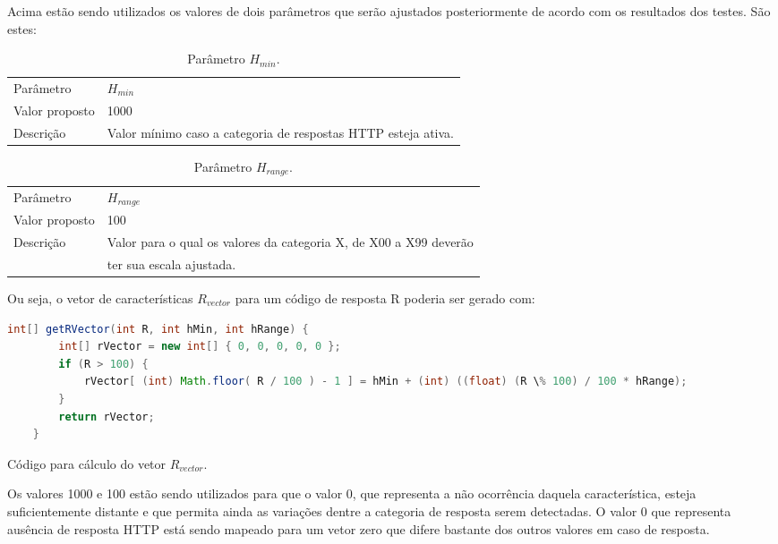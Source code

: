 Acima estão sendo utilizados os valores de dois parâmetros que serão ajustados
posteriormente de acordo com os resultados dos testes. São estes:

\begin{table}[H]
\caption{Parâmetro $H_{min}$.}
\vspace{0.25cm}
\begin{tabular}{ll}
Parâmetro      & $H_{min}$ \\
Valor proposto & 1000 \\
Descrição      & Valor mínimo caso a categoria de respostas HTTP esteja ativa.
\end{tabular}
\end{table}

\begin{table}[H]
\caption{Parâmetro $H_{range}$.}
\vspace{0.25cm}
\begin{tabular}{ll}
Parâmetro      & $H_{range}$ \\
Valor proposto & 100 \\
Descrição      & Valor para o qual os valores da categoria X, de X00 a X99 deverão \\
               & ter sua escala ajustada.
\end{tabular}
\end{table}

Ou seja, o vetor de características $R_{vector}$ para um código de resposta R poderia ser gerado com:

\begin{program}
  \centering
  \begin{lstlisting}[language=Java, style=wider]
    int[] getRVector(int R, int hMin, int hRange) {
        int[] rVector = new int[] { 0, 0, 0, 0, 0 };
        if (R > 100) {
            rVector[ (int) Math.floor( R / 100 ) - 1 ] = hMin + (int) ((float) (R \% 100) / 100 * hRange);
        }
	    return rVector;
	}
  \end{lstlisting}
  \caption{Código para cálculo do vetor $R_{vector}$.\label{prog:java}}
\end{program}

Os valores 1000 e 100 estão sendo utilizados para que o valor 0, que representa
a não ocorrência daquela característica, esteja suficientemente distante e que
permita ainda as variações dentre a categoria de resposta serem detectadas.
O valor 0 que representa ausência de resposta HTTP está sendo mapeado para um
vetor zero que difere bastante dos outros valores em caso de resposta.

